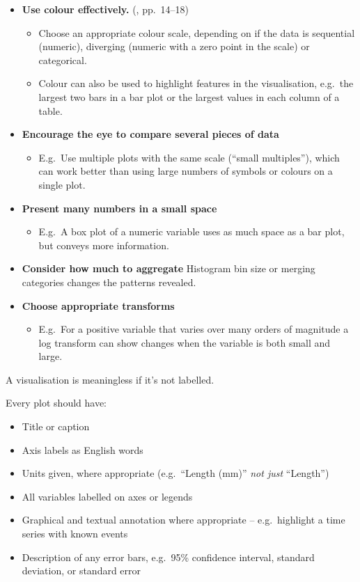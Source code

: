 \documentclass[10pt]{article}
\newlength{\calloutparindent}
\newenvironment{callout}[2][standard]{
  \setlength{\calloutparindent}{\parindent}
  \begin{tcolorbox}[enhanced jigsaw,
    leftrule=.15mm, toprule=.15mm,
    colframe=quarto-callout-#1-color-frame, opacityback=0,
    colback=white, coltitle=black, rightrule=.15mm, breakable,
    colbacktitle=quarto-callout-#1-color!50!white,
    opacitybacktitle=0.6, titlerule=0mm, left=1mm,right=1mm,
    title=\textcolor{quarto-callout-#1-color}{\expandafter\csname
      quartocallout#1icon\endcsname}{\textbf{#2}},
    drop shadow,
    bottomrule=.15mm, toptitle=1mm, arc=.35mm, bottomtitle=1mm,
    before=\par\medskip]%
    \setlength{\parindent}{\calloutparindent}\noindent\ignorespaces}%
  {\end{tcolorbox}}
\newcommand{\principle}[3]{\begin{callout}{#1}\raggedright#2\tcblower\raggedright#3\end{callout}}
\begin{document}
\begin{multicols}{3}
{\begin{itemize}[itemsep=1ex]
  clearer in graphics than tables. However, tables are a form of
  visualisation, and good for conveying raw data or dealing with large
  numbers of variables.
\item \textbf{Use colour effectively.} (\citealp{WexlEtal17big}, pp.~14--18)
  \begin{itemize}
  \item Choose an appropriate colour scale, depending on if the data
    is sequential (numeric), diverging (numeric with a zero point in
    the scale) or categorical.
  \item Colour can also be used to highlight features in the visualisation,
    e.g.~the largest two bars in a bar plot or the largest values in
    each column of a table.
  \end{itemize}
\item \textbf{Encourage the eye to compare several pieces of data}
  \begin{itemize}
  \item E.g.~Use multiple plots with the same scale (``small
    multiples''), which can work better than using large numbers of
    symbols or colours on a single plot.
  \end{itemize}
\item \textbf{Present many numbers in a small space}
  \begin{itemize}
  \item E.g.~A box plot of a numeric variable uses as much space as a
    bar plot, but conveys more information.
  \end{itemize}
\item \textbf{Consider how much to aggregate} Histogram bin size or
  merging categories changes the patterns revealed.
\item \textbf{Choose appropriate transforms}
  \begin{itemize}
  \item E.g.~For a positive variable that varies over many orders of
    magnitude %
    a log transform can show changes when the variable is both small
    and large.
  \end{itemize}
\end{itemize}
}

\principle{Principle 2:  Make the meaning of the data clear}%
{A visualisation is meaningless if it's not labelled.}%
{Every plot should have:
\begin{itemize}
\item Title or caption
\item Axis labels as English words
\item Units given, where appropriate (e.g.~``Length (mm)''
  \emph{not just} ``Length'')
\item All variables labelled on axes or legends
\item Graphical and textual annotation where appropriate --
  e.g.~highlight a time series with known events
\item Description of any error bars, e.g.~95\% confidence interval,
  standard deviation, or standard error
\end{itemize}
}


\end{multicols}
\end{document}
